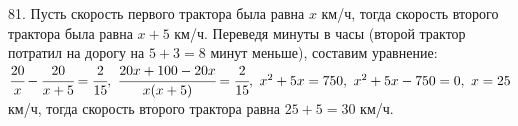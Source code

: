 81. Пусть скорость первого трактора была равна $x$ км/ч, тогда скорость второго трактора была равна $x+5$ км/ч. Переведя минуты в часы (второй трактор потратил на дорогу на $5+3=8$ минут меньше), составим уравнение: $\cfrac{20}{x}-\cfrac{20}{x+5}=\cfrac{2}{15},\
\cfrac{20x+100-20x}{x(x+5)}=\cfrac{2}{15},\ x^2+5x=750,\ x^2+5x-750=0,\ x=25$км/ч, тогда скорость второго трактора равна $25+5=30$ км/ч.\\
